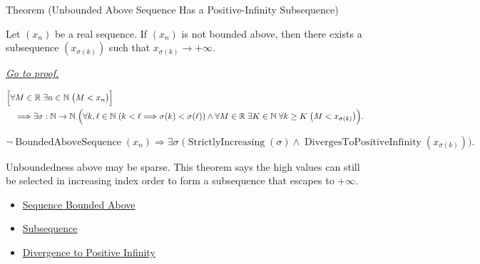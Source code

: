 
\begin{theorembox}{Theorem (Unbounded Above Sequence Has a Positive-Infinity Subsequence)}
\begin{theorem}
\label{thm:unbounded-above-has-positive-infinity-subsequence}
Let $(x_n)$ be a real sequence. If $(x_n)$ is not bounded above, then
there exists a subsequence $(x_{\sigma(k)})$ such that
$x_{\sigma(k)}\to+\infty$.

\smallskip
\noindent
\hyperref[prf:unbounded-above-has-positive-infinity-subsequence]{\textit{Go to proof.}}
\end{theorem}
\end{theorembox}

\begin{remark*}
\[
\begin{aligned}
&\Bigl[
  \forall M\in\mathbb{R}\;\exists n\in\mathbb{N}\;\bigl(M<x_n\bigr)
\Bigr]\\
&\quad\Longrightarrow
\exists \sigma:\mathbb{N}\to\mathbb{N}\;
\Bigl(
  \forall k,\ell\in\mathbb{N}\;(k<\ell\Longrightarrow \sigma(k)<\sigma(\ell))
  \land
  \forall M\in\mathbb{R}\;\exists K\in\mathbb{N}\;\forall k\ge K
  \;\bigl(M<x_{\sigma(k)}\bigr)
\Bigr).
\end{aligned}
\]
\end{remark*}

\begin{remark*}
\[
\neg\operatorname{BoundedAboveSequence}(x_n)
\Longrightarrow
\exists \sigma\;
\bigl(
  \operatorname{StrictlyIncreasing}(\sigma)
  \land
  \operatorname{DivergesToPositiveInfinity}(x_{\sigma(k)})
\bigr).
\]
\end{remark*}

\begin{remark*}[Interpretation]
Unboundedness above may be sparse. This theorem says the high values can
still be selected in increasing index order to form a subsequence that
escapes to $+\infty$.
\end{remark*}

\begin{dependencies}
\begin{itemize}
  \item \hyperref[def:sequence-bounded-above]{Sequence Bounded Above}
  \item \hyperref[def:subsequence]{Subsequence}
  \item \hyperref[def:diverges-to-positive-infinity]{Divergence to Positive Infinity}
\end{itemize}
\end{dependencies}

